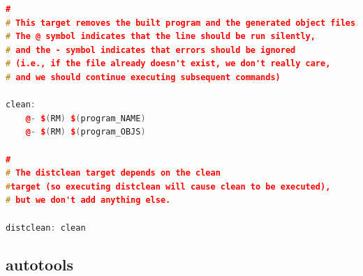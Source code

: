 \documentclass[a4paper,11pt,twoside]{book}
\begin{document}
\begin{itemize}
\begin{lstlisting}[frame=single,  basicstyle=\small, language=c++, mathescape=false]
#
# This target removes the built program and the generated object files. 
# The @ symbol indicates that the line should be run silently, 
# and the - symbol indicates that errors should be ignored 
# (i.e., if the file already doesn't exist, we don't really care, 
# and we should continue executing subsequent commands)

clean:
    @- $(RM) $(program_NAME)
    @- $(RM) $(program_OBJS)

#
# The distclean target depends on the clean
#target (so executing distclean will cause clean to be executed), 
# but we don't add anything else.

distclean: clean
\end{lstlisting}


\end{itemize}
\subsection{autotools}
\end{document}
